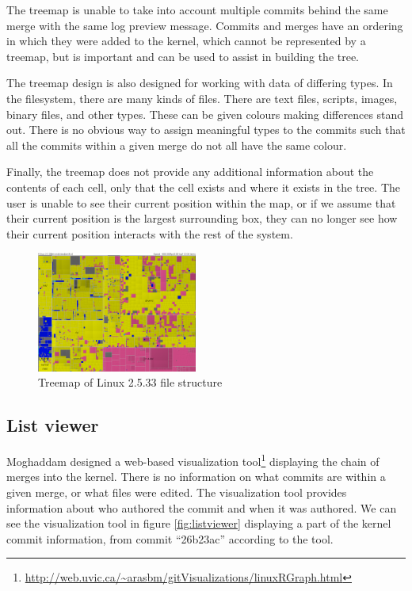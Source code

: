 \documentclass[conference, draftclsnofoot]{IEEEtran}
\begin{document}
The treemap is unable to take into account multiple commits behind the same merge
with the same log preview message. Commits and merges have an ordering in which they
were added to the kernel, which cannot be represented by a treemap, but is important
and can be used to assist in building the tree.

The treemap design is also designed for working with data of differing types.
In the filesystem, there are many kinds of files. There are text files,
scripts, images, binary files, and other types. These can be given colours
making differences stand out. There is no obvious way to assign meaningful
types to the commits such that all the commits within a given merge do not all
have the same colour.

Finally, the treemap does not provide any additional information about the
contents of each cell, only that the cell exists and where it exists in the
tree. The user is unable to see their current position within the map, or if we
assume that their current position is the largest surrounding box, they can
no longer see how their current position interacts with the rest of the
system.

\begin{figure}
        \centering
        \includegraphics[width=0.47\textwidth]{figures/kernel-files.png}
        \caption{Treemap of Linux 2.5.33 file structure}
        \label{fig:treemap}
\end{figure}

\subsection{List viewer}

Moghaddam designed a web-based visualization
tool\footnote{\url{http://web.uvic.ca/~arasbm/gitVisualizations/linuxRGraph.html}}
displaying the chain of merges into the kernel. There is no information on what
commits are within a given merge, or what files were edited. The visualization
tool provides information about who authored the commit and when it was
authored. We can see the visualization tool in figure \ref{fig:listviewer}
displaying a part of the kernel commit information, from commit ``26b23ac''
according to the tool.
\end{document}

